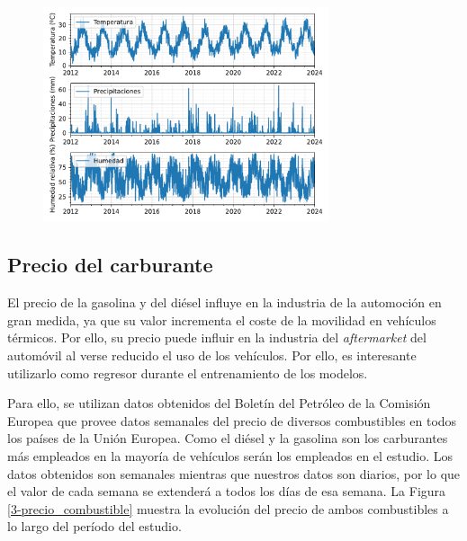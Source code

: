 \begin{figure}[H]
	{\includegraphics[width=0.75\textwidth]{imagenes/grafica_meteo.pdf}}
\end{figure}


\subsection{Precio del carburante}

El precio de la gasolina y del diésel influye en la industria de la automoción en gran medida, ya que su valor incrementa el coste de la movilidad en vehículos térmicos. Por ello, su precio puede influir en la industria del \textit{aftermarket} del automóvil al verse reducido el uso de los vehículos. Por ello, es interesante utilizarlo como regresor durante el entrenamiento de los modelos.

Para ello, se utilizan datos obtenidos del Boletín del Petróleo de la Comisión Europea \cite{petrol} que provee datos semanales del precio de diversos combustibles en todos los países de la Unión Europea. Como el diésel y la gasolina son los carburantes más empleados en la mayoría de vehículos serán los empleados en el estudio. Los datos obtenidos son semanales mientras que nuestros datos son diarios, por lo que el valor de cada semana se extenderá a todos los días de esa semana. La Figura \ref*{3-precio_combustible} muestra la evolución del precio de ambos combustibles a lo largo del período del estudio.

